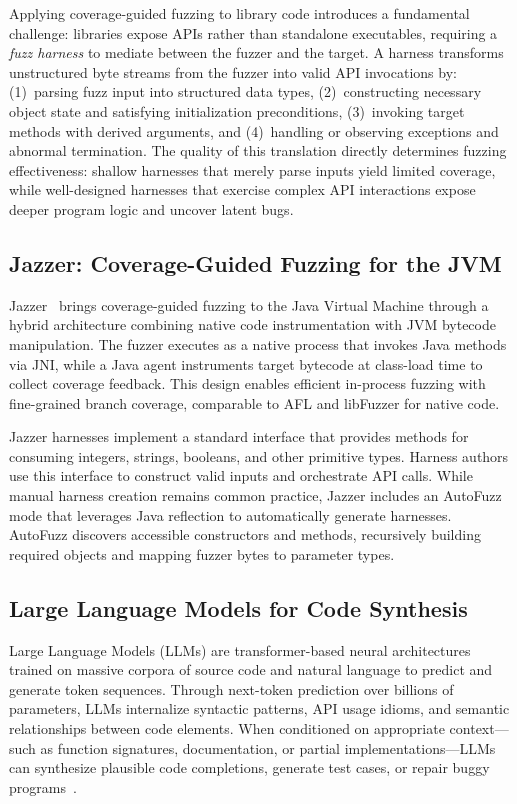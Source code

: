 \documentclass[sigconf,review,anonymous]{acmart}
\begin{document}
Applying coverage-guided fuzzing to library code introduces a fundamental challenge: libraries expose APIs rather than standalone executables, requiring a \emph{fuzz harness} to mediate between the fuzzer and the target. A harness transforms unstructured byte streams from the fuzzer into valid API invocations by: (1)~parsing fuzz input into structured data types, (2)~constructing necessary object state and satisfying initialization preconditions, (3)~invoking target methods with derived arguments, and (4)~handling or observing exceptions and abnormal termination. The quality of this translation directly determines fuzzing effectiveness: shallow harnesses that merely parse inputs yield limited coverage, while well-designed harnesses that exercise complex API interactions expose deeper program logic and uncover latent bugs.

\subsection{Jazzer: Coverage-Guided Fuzzing for the JVM}
\label{sec:prelim:jazzer}

Jazzer~\cite{CITE:Jazzer} brings coverage-guided fuzzing to the Java Virtual Machine through a hybrid architecture combining native code instrumentation with JVM bytecode manipulation. The fuzzer executes as a native process that invokes Java methods via JNI, while a Java agent instruments target bytecode at class-load time to collect coverage feedback. This design enables efficient in-process fuzzing with fine-grained branch coverage, comparable to AFL and libFuzzer for native code.

Jazzer harnesses implement a standard interface that provides methods for consuming integers, strings, booleans, and other primitive types. Harness authors use this interface to construct valid inputs and orchestrate API calls. While manual harness creation remains common practice, Jazzer includes an AutoFuzz mode that leverages Java reflection to automatically generate harnesses. AutoFuzz discovers accessible constructors and methods, recursively building required objects and mapping fuzzer bytes to parameter types. 


\subsection{Large Language Models for Code Synthesis}
\label{sec:prelim:llm}

Large Language Models (LLMs) are transformer-based neural architectures trained on massive corpora of source code and natural language to predict and generate token sequences. Through next-token prediction over billions of parameters, LLMs internalize syntactic patterns, API usage idioms, and semantic relationships between code elements. When conditioned on appropriate context—such as function signatures, documentation, or partial implementations—LLMs can synthesize plausible code completions, generate test cases, or repair buggy programs~\cite{CITE:Codex,CITE:AlphaCode}.
\end{document}
